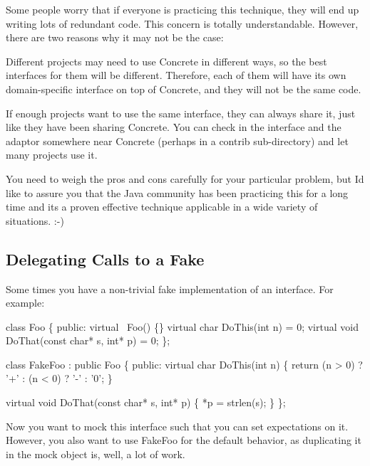 Some people worry that if everyone is practicing this technique, they will end up writing lots of redundant code. This concern is totally understandable. However, there are two reasons why it may not be the case\+:


\begin{DoxyItemize}
\item Different projects may need to use {\ttfamily Concrete} in different ways, so the best interfaces for them will be different. Therefore, each of them will have its own domain-\/specific interface on top of {\ttfamily Concrete}, and they will not be the same code.
\item If enough projects want to use the same interface, they can always share it, just like they have been sharing {\ttfamily Concrete}. You can check in the interface and the adaptor somewhere near {\ttfamily Concrete} (perhaps in a {\ttfamily contrib} sub-\/directory) and let many projects use it.
\end{DoxyItemize}

You need to weigh the pros and cons carefully for your particular problem, but I\textquotesingle{}d like to assure you that the Java community has been practicing this for a long time and it\textquotesingle{}s a proven effective technique applicable in a wide variety of situations. \+:-\/)

\subsection*{Delegating Calls to a Fake}

Some times you have a non-\/trivial fake implementation of an interface. For example\+:


\begin{DoxyCode}
class Foo \{
 public:
  virtual ~Foo() \{\}
  virtual char DoThis(int n) = 0;
  virtual void DoThat(const char* s, int* p) = 0;
\};

class FakeFoo : public Foo \{
 public:
  virtual char DoThis(int n) \{
    return (n > 0) ? '+' :
        (n < 0) ? '-' : '0';
  \}

  virtual void DoThat(const char* s, int* p) \{
    *p = strlen(s);
  \}
\};
\end{DoxyCode}


Now you want to mock this interface such that you can set expectations on it. However, you also want to use {\ttfamily Fake\+Foo} for the default behavior, as duplicating it in the mock object is, well, a lot of work.

